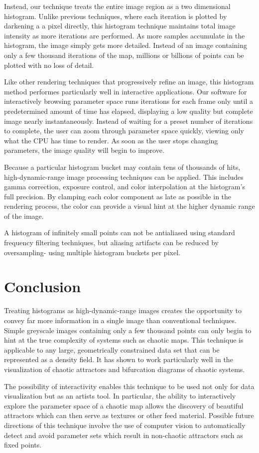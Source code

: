 \documentclass{acmsiggraph}
\begin{document}
Instead, our technique treats the entire image region as a two dimensional
histogram. Unlike previous techniques, where each iteration is plotted by
darkening a a pixel directly, this histogram technique maintains total image
intensity as more iterations are performed. As more samples accumulate in the
histogram, the image simply gets more detailed. Instead of an image containing
only a few thousand iterations of the map, millions or billions of points can
be plotted with no loss of detail.

Like other rendering techniques that progressively refine an image, this
histogram method performes particularly well in interactive applications.
Our software for interactively browsing parameter space runs iterations
for each frame only until a predetermined amount of time has elapsed,
displaying a low quality but complete image nearly instantaneously.
Instead of waiting for a preset number of iterations to complete, the user
can zoom through parameter space quickly, viewing only what the CPU has time
to render. As soon as the user stops changing parameters, the image quality
will begin to improve.

Because a particular histogram bucket may contain tens of thousands of hits,
high-dynamic-range image processing techniques can be applied. This includes
gamma correction, exposure control, and color interpolation at the histogram's
full precision. By clamping each color component as late as possible in the
rendering process, the color can provide a visual hint at the higher
dynamic range of the image.

A histogram of infinitely small points can not be antialiased using standard
frequency filtering techniques, but aliasing artifacts can be reduced by
oversampling- using multiple histogram buckets per pixel.

\section{Conclusion}
Treating histograms as high-dynamic-range images creates the opportunity to
convey far more information in a single image than conventional techniques.
Simple greyscale images containing only a few thousand points can only begin
to hint at the true complexity of systems such as chaotic maps. This technique
is applicable to any large, geometrically constrained data set that can be
represented as a density field. It has shown to work particularly well in
the visualization of chaotic attractors and bifurcation diagrams of chaotic
systems.

The possibility of interactivity enables this technique to be used not only
for data visualization but as an artists tool. In particular, the ability
to interactively explore the parameter space of a chaotic map allows the
discovery of beautiful attractors which can then serve as textures or other
feed material. Possible future directions of this technique involve the use
of computer vision to automatically detect and avoid parameter sets which
result in non-chaotic attractors such as fixed points.
\end{document}
